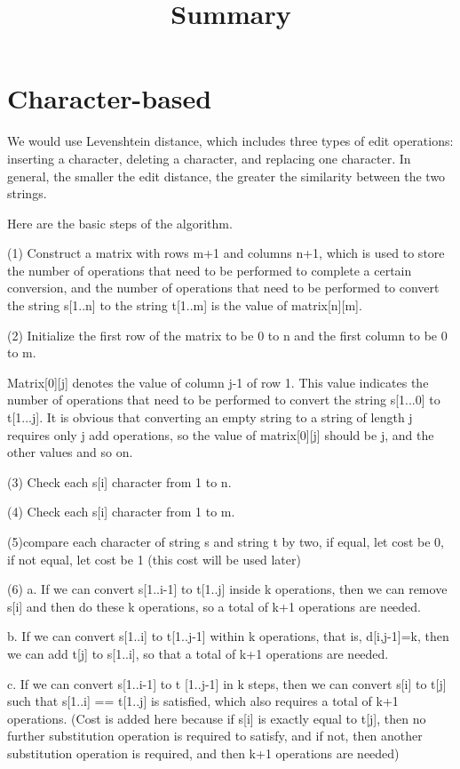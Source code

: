 \documentclass[]{article}
\title{Summary}
\begin{document}
\begin{abstract}
   
\end{abstract}

\section{Character-based}
We would use Levenshtein distance, which includes three types of edit operations: inserting a character, deleting a character, and replacing one character. In general, the smaller the edit distance, the greater the similarity between the two strings.

Here are the basic steps of the algorithm. 

(1) Construct a matrix with rows m+1 and columns n+1, which is used to store the number of operations that need to be performed to complete a certain conversion, and the number of operations that need to be performed to convert the string s[1..n] to the string t[1..m] is the value of matrix[n][m].

(2) Initialize the first row of the matrix to be 0 to n and the first column to be 0 to m.

Matrix[0][j] denotes the value of column j-1 of row 1. This value indicates the number of operations that need to be performed to convert the string s[1...0] to t[1...j]. It is obvious that converting an empty string to a string of length j requires only j add operations, so the value of matrix[0][j] should be j, and the other values and so on.

(3) Check each s[i] character from 1 to n.

(4) Check each s[i] character from 1 to m.

(5)compare each character of string s and string t by two, if equal, let cost be 0, if not equal, let cost be 1 (this cost will be used later)

(6) a. If we can convert s[1..i-1] to t[1..j] inside k operations, then we can remove s[i] and then do these k operations, so a total of k+1 operations are needed.

b. If we can convert s[1..i] to t[1..j-1] within k operations, that is, d[i,j-1]=k, then we can add t[j] to s[1..i], so that a total of k+1 operations are needed.

c. If we can convert s[1..i-1] to t [1..j-1] in k steps, then we can convert s[i] to t[j] such that s[1..i] == t[1..j] is satisfied, which also requires a total of k+1 operations. (Cost is added here because if s[i] is exactly equal to t[j], then no further substitution operation is required to satisfy, and if not, then another substitution operation is required, and then k+1 operations are needed)
\end{document}
